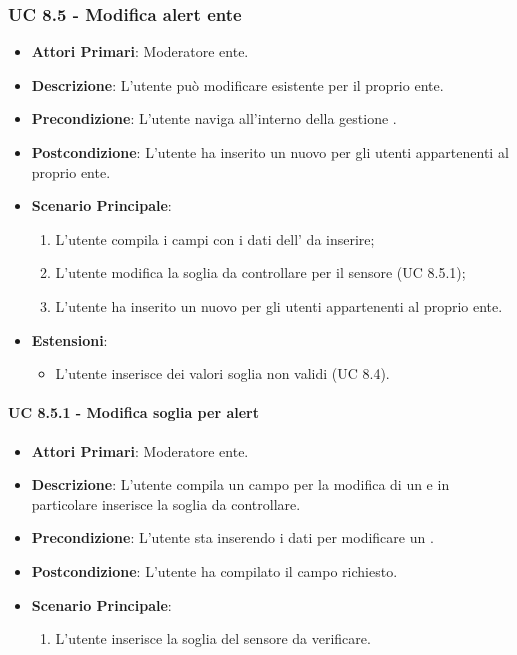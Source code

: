 			\subsubsection{UC 8.5 - Modifica alert ente}
			\begin{itemize}
				\item \textbf{Attori Primari}: Moderatore ente.
				\item \textbf{Descrizione}: L'utente può modificare  esistente per il proprio ente.
				\item \textbf{Precondizione}: L'utente naviga all'interno della gestione .
				\item \textbf{Postcondizione}: L'utente ha inserito un nuovo  per gli utenti appartenenti al proprio ente.
				\item \textbf{Scenario Principale}:
				\begin{enumerate}
					\item{L'utente compila i campi con i dati dell' da inserire;}
					\item L'utente modifica la soglia da controllare per il sensore (UC 8.5.1);
					\item{L'utente ha inserito un nuovo  per gli utenti appartenenti al proprio ente.}
				\end{enumerate}
				\item \textbf{Estensioni}:
				\begin{itemize}
					\item L'utente inserisce dei valori soglia non validi (UC 8.4).
				\end{itemize}		
			\end{itemize}

				\paragraph{UC 8.5.1 - Modifica soglia per alert}
				\begin{itemize}
					\item \textbf{Attori Primari}: Moderatore ente.
					\item \textbf{Descrizione}: L'utente compila un campo per la modifica di un  e in particolare inserisce la soglia da controllare.
					\item \textbf{Precondizione}: L'utente sta inserendo i dati per modificare un .
					\item \textbf{Postcondizione}: L'utente ha compilato il campo richiesto.
					\item \textbf{Scenario Principale}:
					\begin{enumerate}
						\item{L'utente inserisce la soglia del sensore da verificare.}
					\end{enumerate}	
				\end{itemize}